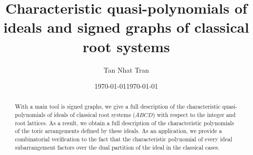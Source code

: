 \documentclass[12pt]{amsart}
\theoremstyle{plain}
\theoremstyle{definition}
\theoremstyle{remark}
\begin{document}
\title[Characteristic quasi-polynomials of ideals]{Characteristic quasi-polynomials of ideals and signed graphs of classical root systems}

\date{\today}

\begin{abstract}
With a main tool is signed graphs, we give a full description of the characteristic quasi-polynomials of ideals of classical root systems ($ABCD$) with respect to the integer and root lattices. 
As a result, we obtain a full description of the characteristic polynomials of the toric arrangements defined by these ideals.
As an application, we provide a combinatorial verification to the fact that the characteristic polynomial of every ideal subarrangement factors over  the dual partition of the ideal in the classical cases.
 \end{abstract}

 
\author{Tan Nhat Tran}
\address{Tan Nhat Tran, Department of Mathematics, Hokkaido University, Kita 10, Nishi 8, Kita-Ku, Sapporo 060-0810, Japan.}





\date{\today}
\maketitle


\end{document}
